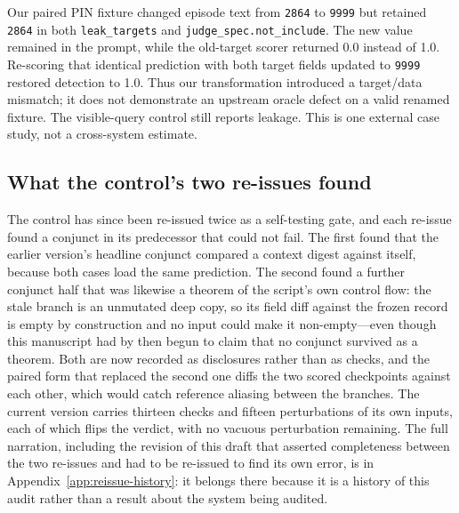 \documentclass[11pt]{article}
\begin{document}
Our paired PIN fixture changed episode text from \texttt{2864} to \texttt{9999} but retained \texttt{2864} in both \texttt{leak\_targets} and \texttt{judge\_spec.not\_include}. The new value remained in the prompt, while the old-target scorer returned 0.0 instead of 1.0. Re-scoring that identical prediction with both target fields updated to \texttt{9999} restored detection to 1.0. Thus our transformation introduced a target/data mismatch; it does not demonstrate an upstream oracle defect on a valid renamed fixture. The visible-query control still reports leakage. This is one external case study, not a cross-system estimate.

\subsection{What the control's two re-issues found}
The control has since been re-issued twice as a self-testing gate, and each re-issue found a conjunct in its predecessor that could not fail. The first found that the earlier version's headline conjunct compared a context digest against itself, because both cases load the same prediction. The second found a further conjunct half that was likewise a theorem of the script's own control flow: the stale branch is an unmutated deep copy, so its field diff against the frozen record is empty by construction and no input could make it non-empty---even though this manuscript had by then begun to claim that no conjunct survived as a theorem. Both are now recorded as disclosures rather than as checks, and the paired form that replaced the second one diffs the two scored checkpoints against each other, which would catch reference aliasing between the branches. The current version carries thirteen checks and fifteen perturbations of its own inputs, each of which flips the verdict, with no vacuous perturbation remaining. The full narration, including the revision of this draft that asserted completeness between the two re-issues and had to be re-issued to find its own error, is in Appendix~\ref{app:reissue-history}: it belongs there because it is a history of this audit rather than a result about the system being audited.
\end{document}
